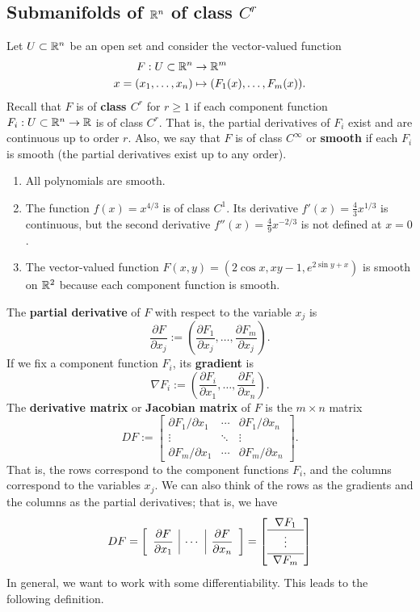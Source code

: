 \subsection{Submanifolds of $\mathbb{R}^n$ of class $C^r$} \label{subsec:1.4}
Let $U \subset \mathbb{R}^n$ be an open set and consider the vector-valued function 
\begin{align*}
    F : U \subset \mathbb{R}^n &\to \mathbb{R}^m \\ 
    x = (x_1, \dots, x_n) &\mapsto (F_1(x), \dots, F_m(x)). 
\end{align*}
Recall that $F$ is of {\bf class $C^r$} for $r \geq 1$ if each component 
function $F_i : U \subset \mathbb{R}^n \to \mathbb{R}$ is of class $C^r$. That is, 
the partial derivatives of $F_i$ exist and are continuous up to order $r$. 
Also, we say that $F$ is of class $C^\infty$ or {\bf smooth} if each 
$F_i$ is smooth (the partial derivatives exist up to any order).
\begin{enumerate}[(1)]
    \item All polynomials are smooth. 
    \item The function $f(x) = x^{4/3}$ is of class $C^1$. Its derivative 
    $f'(x) = \frac43 x^{1/3}$ is continuous, but the second derivative 
    $f''(x) = \frac49 x^{-2/3}$ is not defined at $x = 0$. 
    \item The vector-valued function $F(x, y) = (2\cos x, xy - 1, e^{2\sin y+x})$ 
    is smooth on $\mathbb{R}^2$ because each component function is smooth. 
\end{enumerate}
The {\bf partial derivative} of $F$ with respect to the variable $x_j$ is 
\[ \frac{\partial F}{\partial x_j} := \left( \frac{\partial F_1}{\partial x_j}, 
\dots, \frac{\partial F_m}{\partial x_j} \right). \] 
If we fix a component function $F_i$, its {\bf gradient} is 
\[ \nabla F_i := \left( \frac{\partial F_i}{\partial x_1}, 
\dots, \frac{\partial F_i}{\partial x_n} \right). \] 
The {\bf derivative matrix} or {\bf Jacobian matrix} of $F$ is the $m \times n$ 
matrix 
\[ DF := \begin{bmatrix} 
    \partial F_1/\partial x_1 & \cdots & \partial F_1/\partial x_n \\ 
    \vdots & \ddots & \vdots \\ 
    \partial F_m/\partial x_1 & \cdots & \partial F_m/\partial x_n
\end{bmatrix}. \] 
That is, the rows correspond to the component functions $F_i$, and the 
columns correspond to the variables $x_j$. We can also think of the 
rows as the gradients and the columns as the partial derivatives; that is, 
we have 
\[ DF = \mleft[ \begin{array}{c|c|c}
    \dfrac{\partial F}{\partial x_1} & \cdots & \dfrac{\partial F}{\partial x_n}
\end{array} \mright] = \mleft[ \begin{array}{c}
    \nabla F_1 \\ \hline 
    \vdots \\[2pt] \hline 
    \nabla F_m \\
\end{array} \mright] \] 
In general, we want to work with some differentiability. 
This leads to the following definition. 

